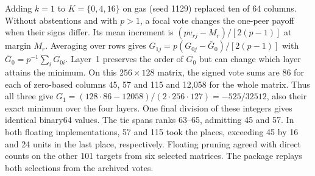 Adding $k=1$ to $K=\{0,4,16\}$ on gas (seed 1129) replaced ten of 64 columns. Without abstentions and with $p>1$, a focal vote changes the one-peer payoff when their signs differ. Its mean increment is $(pv_{rj}-M_r)/[2(p-1)]$ at margin $M_r$. Averaging over rows gives $G_{1j}=p(G_{0j}-\bar G_0)/[2(p-1)]$ with $\bar G_0=p^{-1}\sum_iG_{0i}$. Layer~1 preserves the order of $G_0$ but can change which layer attains the minimum.
On this $256\times128$ matrix, the signed vote sums are 86 for each of zero-based columns 45, 57 and 115 and 12,058 for the whole matrix. Thus all three give $G_1=(128\cdot86-12058)/(2\cdot256\cdot127)=-525/32512$, also their exact minimum over the four layers. One final division of these integers gives identical binary64 values. The tie spans ranks 63--65, admitting 45 and 57. In both floating implementations, 57 and 115 took the places, exceeding 45 by 16 and 24 units in the last place, respectively. Floating pruning agreed with direct counts on the other 101 targets from six selected matrices. The package replays both selections from the archived votes.
